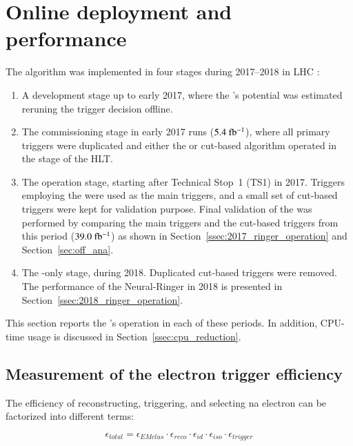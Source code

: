 \section{Online deployment and performance}%
\label{sec:operation}


 The \rnn{} algorithm was implemented in four stages during 2017--2018 in LHC \RunTwo:

\begin{enumerate}[i]
  \item A development stage up to early 2017, where the \rnn{}'s
      potential was estimated reruning the trigger decision offline.
  \item The commissioning stage in
      early 2017 runs ($5.4~\mbox{fb\(^{-1}\)}$), where all primary
      triggers were duplicated and either the \rnn{} or cut-based algorithm
      operated in the \fastcalo{} stage of the HLT.
   \item The operation stage, starting after Technical Stop~1 (TS1) in 2017. Triggers employing the \rnn{} were used as the main triggers, and a small set of cut-based triggers were kept for validation purpose. Final validation of the \rnn{} was performed by comparing the main triggers and the cut-based triggers from this period ($39.0~\mbox{fb\(^{-1}\)}$) as shown in Section~\ref{ssec:2017_ringer_operation} and Section~\ref{sec:off_ana}.
    \item The \rnn{}-only stage, during 2018. Duplicated cut-based triggers were removed. The performance of the Neural-Ringer in 2018 is presented in Section~\ref{ssec:2018_ringer_operation}.
    
\end{enumerate}

This section reports the \rnn{}'s operation in each of these periods. In addition, CPU-time usage is discussed in Section~\ref{ssec:cpu_reduction}.

\subsection{Measurement of the electron trigger efficiency}

The efficiency of reconstructing, triggering, and selecting na electron can be factorized into different terms:

\begin{equation}
    \epsilon_{total}=\epsilon_{EMclus}\cdot\epsilon_{reco}\cdot\epsilon_{id}\cdot\epsilon_{iso}\cdot\epsilon_{trigger}
\end{equation}

